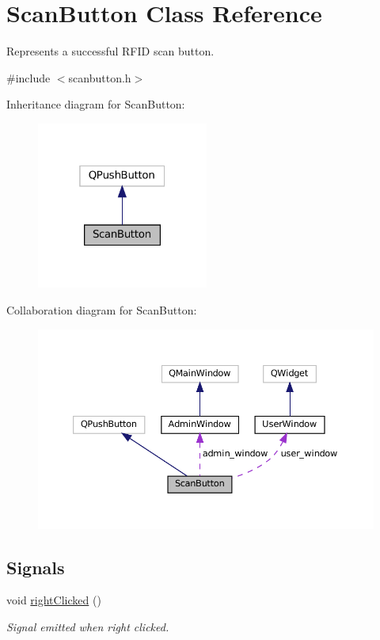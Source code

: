 \hypertarget{classScanButton}{}\section{Scan\+Button Class Reference}
\label{classScanButton}


Represents a successful R\+F\+ID scan button.  




{\ttfamily \#include $<$scanbutton.\+h$>$}



Inheritance diagram for Scan\+Button\+:
\nopagebreak
\begin{figure}[H]
\begin{center}
\leavevmode
\includegraphics[width=160pt]{classScanButton__inherit__graph}
\end{center}
\end{figure}


Collaboration diagram for Scan\+Button\+:
\nopagebreak
\begin{figure}[H]
\begin{center}
\leavevmode
\includegraphics[width=350pt]{classScanButton__coll__graph}
\end{center}
\end{figure}
\subsection*{Signals}
\begin{DoxyCompactItemize}
\item 
\mbox{\label{classScanButton_a6992033b8da2e3182f2956ab346b9a5a}} 
void \hyperlink{classScanButton_a6992033b8da2e3182f2956ab346b9a5a}{right\+Clicked} ()
\begin{DoxyCompactList}\small\item\em Signal emitted when right clicked. \end{DoxyCompactList}\end{DoxyCompactItemize}
